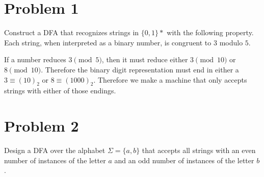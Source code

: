 \documentclass{eeleyes}
\begin{document}
\section*{Problem 1}
Construct a DFA that recognizes strings in $\{0, 1\}*$ with the following property. Each string, when interpreted as a binary number, is congruent to $3$ modulo $5$. 

\begin{solution}
    If a number reduces $3 \pmod{5}$, then it must reduce either $3 \pmod{10}$ or $8 \pmod{10}$. Therefore the binary digit representation must end in either a $3 \equiv (10)_2$ or $8 \equiv (1000)_2$. Therefore we make a machine that only accepts strings with either of those endings.

    \begin{center}
    \end{center}
\end{solution}

\section*{Problem 2}
Design a DFA over the alphabet $\Sigma = \{a, b\}$ that accepts all strings with an even number of instances of the letter $a$ and an odd number of instances of the letter $b$.
\end{document}
